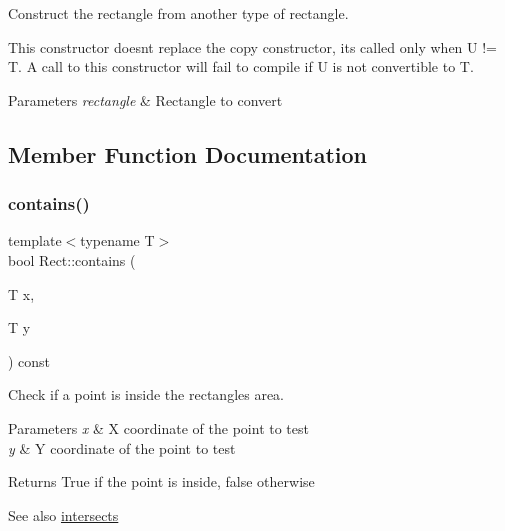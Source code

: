 Construct the rectangle from another type of rectangle. 

This constructor doesn\textquotesingle{}t replace the copy constructor, it\textquotesingle{}s called only when U != T. A call to this constructor will fail to compile if U is not convertible to T.


\begin{DoxyParams}{Parameters}
{\em rectangle} & Rectangle to convert \\
\hline
\end{DoxyParams}


\subsection{Member Function Documentation}
\mbox{\label{classsf_1_1_rect_a1d8a4a3aecec18310f6e3e23db43dfb8}} 
\subsubsection{\texorpdfstring{contains()}{contains()}\hspace{0.1cm}{\footnotesize\ttfamily [1/2]}}
{\footnotesize\ttfamily template$<$typename T$>$ \\
bool Rect\+::contains (\begin{DoxyParamCaption}\item[{T}]{x,  }\item[{T}]{y }\end{DoxyParamCaption}) const}



Check if a point is inside the rectangle\textquotesingle{}s area. 


\begin{DoxyParams}{Parameters}
{\em x} & X coordinate of the point to test \\
\hline
{\em y} & Y coordinate of the point to test\\
\hline
\end{DoxyParams}
\begin{DoxyReturn}{Returns}
True if the point is inside, false otherwise
\end{DoxyReturn}
\begin{DoxySeeAlso}{See also}
\hyperlink{classsf_1_1_rect_ad90321b1135cad31589f2db2f9b772db}{intersects} 
\end{DoxySeeAlso}
\mbox{\label{classsf_1_1_rect_aa254e12d95ecf460ace8b2784fbab5eb}} 

